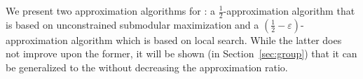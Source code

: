 We present two approximation algorithms for \carpool: a
$\frac{1}{2}$-approximation algorithm that is based on unconstrained
submodular maximization and a $(\frac{1}{2}
- \varepsilon)$-approximation algorithm which is based on local
search.  While the latter does not improve upon the former, it will be
shown (in Section~\ref{sec:group}) that it can be generalized to
the \gcp without decreasing the approximation ratio.
 
